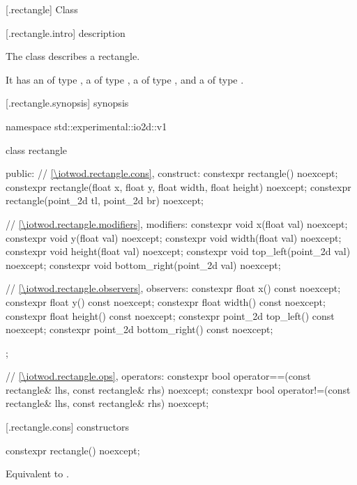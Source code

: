  [\iotwod.rectangle] {Class }

 [\iotwod.rectangle.intro] { description}

%
\pnum
The class  describes a rectangle.

\pnum
It has an  of type , a  of type , a  of type , and a  of type .

 [\iotwod.rectangle.synopsis] { synopsis}

\begin{codeblock}
namespace std::experimental::io2d::v1 {
  class rectangle {
  public:
    // \ref{\iotwod.rectangle.cons}, construct:
    constexpr rectangle() noexcept;
    constexpr rectangle(float x, float y, float width, float height)
      noexcept;
    constexpr rectangle(point_2d tl, point_2d br) noexcept;

    // \ref{\iotwod.rectangle.modifiers}, modifiers:
    constexpr void x(float val) noexcept;
    constexpr void y(float val) noexcept;
    constexpr void width(float val) noexcept;
    constexpr void height(float val) noexcept;
    constexpr void top_left(point_2d val) noexcept;
    constexpr void bottom_right(point_2d val) noexcept;
    
    // \ref{\iotwod.rectangle.observers}, observers:
    constexpr float x() const noexcept;
    constexpr float y() const noexcept;
    constexpr float width() const noexcept;
    constexpr float height() const noexcept;
    constexpr point_2d top_left() const noexcept;
    constexpr point_2d bottom_right() const noexcept;
  };
  
  // \ref{\iotwod.rectangle.ops}, operators:
  constexpr bool operator==(const rectangle& lhs, const rectangle& rhs) 
    noexcept;
  constexpr bool operator!=(const rectangle& lhs, const rectangle& rhs) 
    noexcept;
}
\end{codeblock}

 [\iotwod.rectangle.cons] { constructors}

%
\begin{itemdecl}
constexpr rectangle() noexcept;
\end{itemdecl}
\begin{itemdescr}
\pnum
\effects
Equivalent to .
\end{itemdescr}

